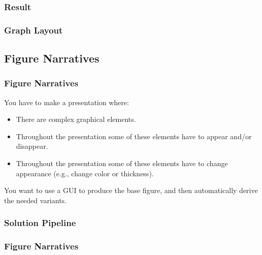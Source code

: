 {\subsubsection{Result}
\begin{frame}[fragile]
  \frametitle{Graph Layout }
  \vspace{12mm}
  
\end{frame}

\subsection{Figure Narratives}
\begin{frame}[fragile]
  \frametitle{Figure Narratives}
  \vspace{3mm}
  You have to make a presentation where:
  \begin{itemize}
    \item There are complex graphical elements.
    \item Throughout the presentation some of these elements have to appear and/or disappear.
    \item Throughout the presentation some of these elements have to change appearance (e.g., change color or thickness).
  \end{itemize}
  
  \vspace{5mm}
  You want to use a GUI to produce the base figure, and then automatically derive the needed variants.
\end{frame}

\subsubsection{Solution Pipeline}
\begin{frame}[fragile]
  \frametitle{Figure Narratives }
  \vspace{7mm}
  \begin{center}
\end{center}
\end{frame}}
